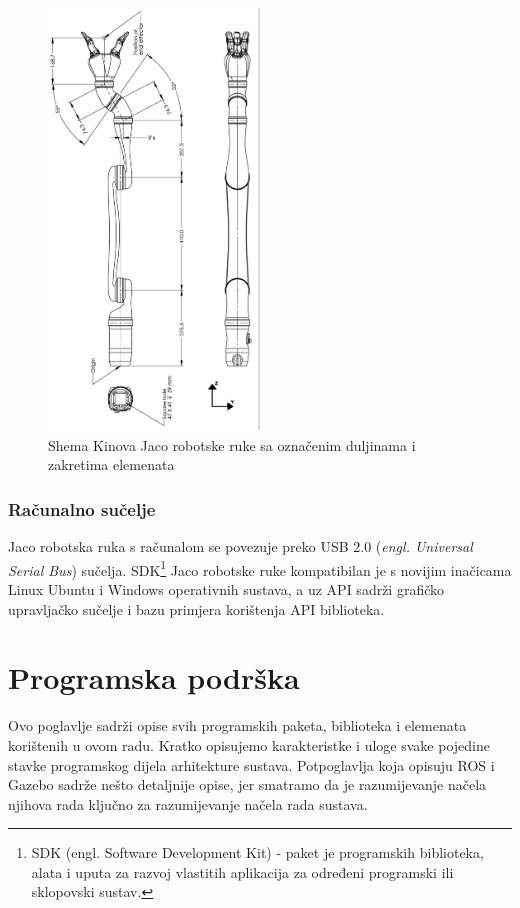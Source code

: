 \documentclass[times, utf8, diplomski, numeric]{fer}
\begin{document}
\begin{figure}[h!]
\centering
\includegraphics[width = 0.5\textwidth]{jaco_cad}
\caption{Shema Kinova Jaco robotske ruke sa označenim duljinama i zakretima elemenata}
\end{figure}

\subsection{Računalno sučelje}
Jaco robotska ruka s računalom se povezuje preko USB 2.0 (\textit{engl. Universal Serial Bus}) sučelja.
SDK\footnote{SDK (engl. Software Development Kit) - paket je programskih biblioteka, alata i uputa za razvoj vlastitih aplikacija za određeni programski ili sklopovski sustav.} Jaco robotske ruke kompatibilan je s novijim inačicama Linux Ubuntu i Windows operativnih sustava, a uz API sadrži grafičko upravljačko sučelje i bazu primjera korištenja API biblioteka.



\chapter{Programska podrška}
Ovo poglavlje sadrži opise svih programskih paketa, biblioteka i elemenata korištenih u ovom radu. 
Kratko opisujemo karakteristke i uloge svake pojedine stavke programskog dijela arhitekture sustava.
Potpoglavlja koja opisuju ROS i Gazebo sadrže nešto detaljnije opise, jer smatramo da je razumijevanje načela njihova rada ključno za razumijevanje načela rada sustava.
\end{document}
